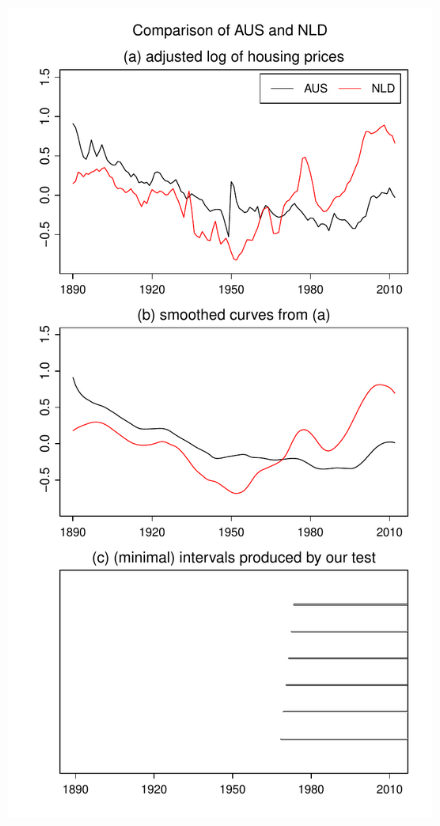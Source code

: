 \documentclass[a4paper,12pt]{article}
\makeatletter
\renewcommand{\eqref}[1]{\tagform@{\ref{#1}}}
\makeatother
\begin{document}


\begin{figure}
\begin{minipage}[t]{0.24\textwidth}
\includegraphics[width=\textwidth]{output/plots/hp/AUS_vs_NLD}

\end{minipage}
\end{figure}
\end{document}
